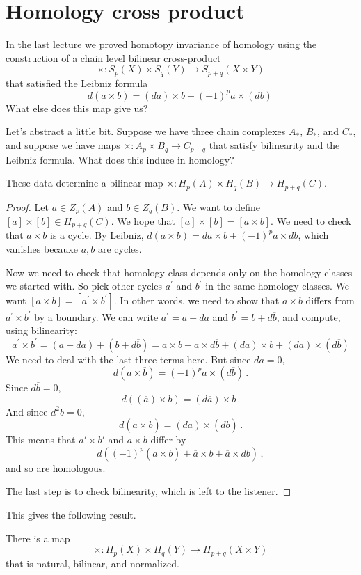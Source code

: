 \section{Homology cross product}

In the last lecture we proved homotopy invariance of homology using the
construction of a chain level bilinear cross-product
\[
\times:S_p(X)\times S_q(Y)\to S_{p+q}(X\times Y)
\]
that satisfied the Leibniz formula
\[
d(a\times b)=(da)\times b+(-1)^pa\times(db)\,
\]
What else does this map give us? 

Let's abstract a little bit. Suppose we have three chain complexes $A_*$, $B_*$, and $C_*$, and suppose we have maps $\times: A_p\times B_q\to C_{p+q}$ that satisfy bilinearity and the Leibniz formula. What does this induce in homology?
\begin{lemma}
These data determine a bilinear map $\times:H_p(A)\times H_q(B)\to H_{p+q}(C)$.
\end{lemma}
\begin{proof}
Let $a\in Z_p(A)$ and $b\in Z_q(B)$. We want to define $[a]\times [b]\in H_{p+q}(C)$. We hope that $[a]\times [b]=[a\times b]$. We need to check that $a\times b$ is a cycle. By Leibniz, $d(a\times b)=da\times b+(-1)^pa\times db$, which 
vanishes becauxe $a,b$ are cycles.

Now we need to check that homology class depends only on the homology classes 
we started with.
So pick other cycles $a^\prime$ and $b^\prime$ in the same homology classes. We want $[a\times b]=[a^\prime\times b^\prime]$. In other words, we need to show that $a\times b$ differs from $a^\prime\times b^\prime$ by a boundary. We can write $a^\prime=a+d\overline{a}$ and $b^\prime=b+d\overline{b}$, and compute, using bilinearity:
	\begin{equation*}
	a^\prime\times b^\prime=(a+d\overline{a})+(b+d\overline{b})
	= a\times b+a\times d\overline{b} + (d\overline{a})\times b+(d\overline{a})\times(d\overline{b})
	\end{equation*}
We need to deal with the last three terms here. But since $da=0$,
\[
d(a\times\overline b)=(-1)^pa\times(d\overline b)\,.
\]
Since $d\overline b=0$, 
\[
d((\overline a)\times b)=(d\overline a)\times b\,.
\]
And since $d^2\overline b=0$, 
\[ 
d(a\times\overline{b})=
(d\overline a)\times(d\overline{b})\,.
\]
This means that $a'\times b'$ and $a\times b$ differ by 
\[
d\left((-1)^p(a\times \overline{b}) + \overline{a}\times b + \overline{a}\times d\overline{b}\right)\,,
\]
and so are homologous. 

The last step is to check bilinearity, which is left to the listener.
\end{proof}
This gives the following result.
\begin{theorem}
There is a map 
\[
\times:H_p(X)\times H_q(Y)\to H_{p+q}(X\times Y)
\]
that is natural, bilinear, and normalized. 
\end{theorem}

